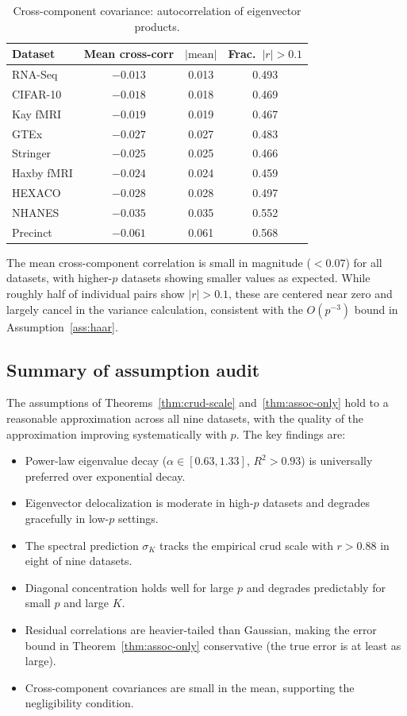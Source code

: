 \begin{table}[h]
\centering
\caption{Cross-component covariance: autocorrelation of eigenvector products.}
\label{tab:crosscomp}
\begin{tabular}{lccc}
\toprule
Dataset & Mean cross-corr & $|\text{mean}|$ & Frac.\ $|r| > 0.1$ \\
\midrule
RNA-Seq    & $-0.013$ & 0.013 & 0.493 \\
CIFAR-10   & $-0.018$ & 0.018 & 0.469 \\
Kay fMRI   & $-0.019$ & 0.019 & 0.467 \\
GTEx       & $-0.027$ & 0.027 & 0.483 \\
Stringer   & $-0.025$ & 0.025 & 0.466 \\
Haxby fMRI & $-0.024$ & 0.024 & 0.459 \\
HEXACO     & $-0.028$ & 0.028 & 0.497 \\
NHANES     & $-0.035$ & 0.035 & 0.552 \\
Precinct   & $-0.061$ & 0.061 & 0.568 \\
\bottomrule
\end{tabular}
\end{table}

The mean cross-component correlation is small in magnitude ($< 0.07$) for all
datasets, with higher-$p$ datasets showing smaller values as expected.
While roughly half of individual pairs show $|r| > 0.1$, these are centered near
zero and largely cancel in the variance calculation, consistent with the
$O(p^{-3})$ bound in Assumption~\ref{ass:haar}.

\subsection{Summary of assumption audit}

The assumptions of Theorems~\ref{thm:crud-scale} and~\ref{thm:assoc-only} hold
to a reasonable approximation across all nine datasets, with the quality of the
approximation improving systematically with $p$.
The key findings are:
\begin{itemize}
\item Power-law eigenvalue decay ($\alpha \in [0.63, 1.33]$, $R^2 > 0.93$) is
  universally preferred over exponential decay.
\item Eigenvector delocalization is moderate in high-$p$ datasets and degrades
  gracefully in low-$p$ settings.
\item The spectral prediction $\sigma_K$ tracks the empirical crud scale with
  $r > 0.88$ in eight of nine datasets.
\item Diagonal concentration holds well for large $p$ and degrades predictably
  for small $p$ and large $K$.
\item Residual correlations are heavier-tailed than Gaussian, making the error
  bound in Theorem~\ref{thm:assoc-only} conservative (the true error is at
  least as large).
\item Cross-component covariances are small in the mean, supporting the
  negligibility condition.
\end{itemize}
